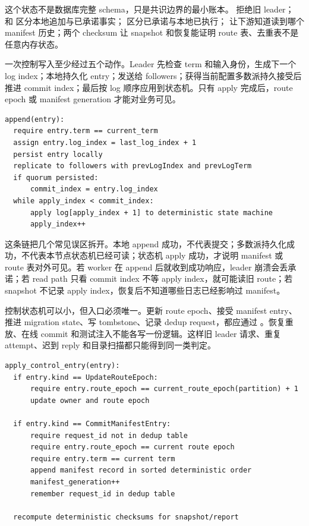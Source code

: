 这个状态不是数据库完整 schema，只是共识边界的最小账本。 拒绝旧 leader； 和  区分本地追加与已承诺事实； 区分已承诺与本地已执行； 让下游知道读到哪个 manifest 历史；两个 checksum 让 snapshot 和恢复能证明 route 表、去重表不是任意内存状态。

一次控制写入至少经过五个动作。Leader 先检查 term 和输入身份，生成下一个 log index；本地持久化 entry；发送给 followers；获得当前配置多数派持久接受后推进 commit index；最后按 log 顺序应用到状态机。只有 apply 完成后，route epoch 或 manifest generation 才能对业务可见。

\begin{lstlisting}[numbers=none,caption={控制日志提交链}]
append(entry):
  require entry.term == current_term
  assign entry.log_index = last_log_index + 1
  persist entry locally
  replicate to followers with prevLogIndex and prevLogTerm
  if quorum persisted:
      commit_index = entry.log_index
  while apply_index < commit_index:
      apply log[apply_index + 1] to deterministic state machine
      apply_index++
\end{lstlisting}

这条链把几个常见误区拆开。本地 append 成功，不代表提交；多数派持久化成功，不代表本节点状态机已经可读；状态机 apply 成功，才说明 manifest 或 route 表对外可见。若 worker 在 append 后就收到成功响应，leader 崩溃会丢承诺；若 read path 只看 commit index 不等 apply index，就可能读旧 route；若 snapshot 不记录 apply index，恢复后不知道哪些日志已经影响过 manifest。

控制状态机可以小，但入口必须唯一。更新 route epoch、接受 manifest entry、推进 migration state、写 tombstone、记录 dedup request，都应通过 。恢复重放、在线 commit 和测试注入不能各写一份逻辑。这样旧 leader 请求、重复 attempt、迟到 reply 和目录扫描都只能得到同一类判定。

\begin{lstlisting}[numbers=none,caption={控制状态机应用入口}]
apply_control_entry(entry):
  if entry.kind == UpdateRouteEpoch:
      require entry.route_epoch == current_route_epoch(partition) + 1
      update owner and route epoch

  if entry.kind == CommitManifestEntry:
      require request_id not in dedup table
      require entry.route_epoch == current route epoch
      require entry.term == current term
      append manifest record in sorted deterministic order
      manifest_generation++
      remember request_id in dedup table

  recompute deterministic checksums for snapshot/report
\end{lstlisting}


